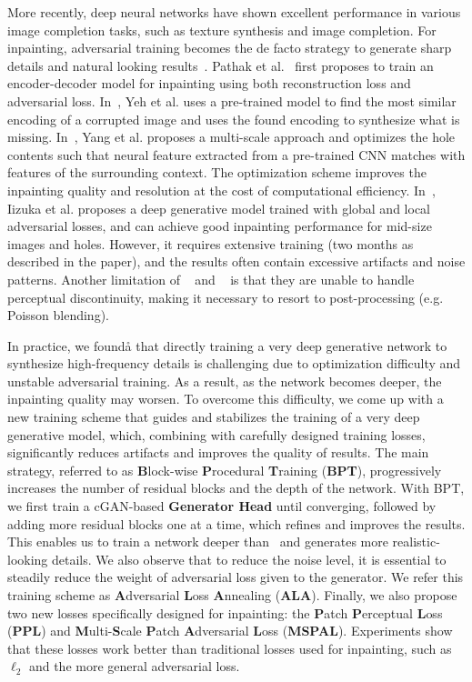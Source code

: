 More recently, deep neural networks have shown excellent performance in various image completion tasks, such as texture synthesis and image completion. For inpainting, adversarial training becomes the de facto strategy to generate sharp details and natural looking results~\cite{pathak2016context,yeh2016semantic,li2017generative,yang2017high,iizuka2017globally}. Pathak et al.~\cite{pathak2016context} first proposes to train an encoder-decoder model for inpainting using both reconstruction loss and adversarial loss. In~\cite{yeh2016semantic}, Yeh et al. uses a pre-trained model to find the most similar encoding of a corrupted image and uses the found encoding to synthesize what is missing. In~\cite{yang2017high}, Yang et al. proposes a multi-scale approach and optimizes the hole contents such that neural feature extracted from a pre-trained CNN matches with features of the surrounding context. The optimization scheme improves the inpainting quality and resolution at the cost of computational efficiency. In~\cite{iizuka2017globally}, Iizuka et al. proposes a deep generative model trained with global and local adversarial losses, and can achieve good inpainting performance for mid-size images and holes. However, it requires extensive training (two months as described in the paper), and the results often contain excessive artifacts and noise patterns. Another limitation of ~\cite{yang2017high} and ~\cite{iizuka2017globally} is that they are unable to handle perceptual discontinuity, making it necessary to resort to post-processing (e.g. Poisson blending).

In practice, we foundå that directly training a very deep generative network to synthesize high-frequency details is challenging due to optimization difficulty and unstable adversarial training. As a result, as the network becomes deeper, the inpainting quality may worsen. To overcome this difficulty, we come up with a new training scheme that guides and stabilizes the training of a very deep generative model, which, combining with carefully designed training losses, significantly reduces artifacts and improves the quality of results. The main strategy, referred to as \textbf{B}lock-wise \textbf{P}rocedural \textbf{T}raining (\textbf{BPT}), progressively increases the number of residual blocks and the depth of the network. With BPT, we first train a cGAN-based \textbf{Generator Head} until converging, followed by adding more residual blocks one at a time, which refines and improves the results. This enables us to train a network deeper than~\cite{iizuka2017globally} and generates more realistic-looking details. We also observe that to reduce the noise level, it is essential to steadily reduce the weight of adversarial loss given to the generator. We refer this training scheme as \textbf{A}dversarial \textbf{L}oss \textbf{A}nnealing (\textbf{ALA}). Finally, we also propose two new losses specifically designed for inpainting: the \textbf{P}atch \textbf{P}erceptual \textbf{L}oss (\textbf{PPL}) and \textbf{M}ulti-\textbf{S}cale \textbf{P}atch \textbf{A}dversarial \textbf{L}oss (\textbf{MSPAL}). Experiments show that these losses work better than traditional losses used for inpainting, such as $\ell_2$ and the more general adversarial loss.

